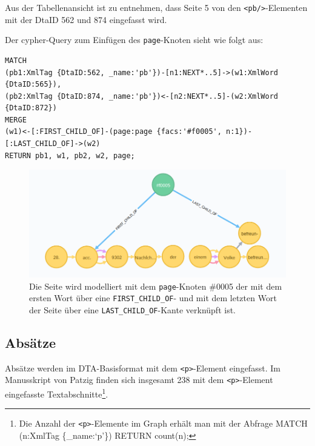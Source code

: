 \documentclass[ngerman,]{scrreprt}
\begin{document}
Aus der Tabellenansicht ist zu entnehmen, dass Seite 5 von den \texttt{\textless{}pb/\textgreater{}}-Elementen mit der DtaID 562 und 874 eingefasst wird.

Der cypher-Query zum Einfügen des \texttt{page}-Knoten sieht wie folgt aus:

\begin{verbatim}
MATCH
(pb1:XmlTag {DtaID:562, _name:'pb'})-[n1:NEXT*..5]->(w1:XmlWord {DtaID:565}),
(pb2:XmlTag {DtaID:874, _name:'pb'})<-[n2:NEXT*..5]-(w2:XmlWord {DtaID:872})
MERGE
(w1)<-[:FIRST_CHILD_OF]-(page:page {facs:'#f0005', n:1})-[:LAST_CHILD_OF]->(w2)
RETURN pb1, w1, pb2, w2, page;
\end{verbatim}

\begin{figure}
\centering
\includegraphics{Bilder/TEI2Graph/page-f0005.png}
\caption[Die Seite wird modelliert mit dem \texttt{page}-Knoten \#0005 der mit dem ersten Wort über eine \texttt{FIRST\_CHILD\_OF}- und mit dem letzten Wort der Seite über eine \texttt{LAST\_CHILD\_OF}-Kante verknüpft ist.]{Die Seite wird modelliert mit dem \texttt{page}-Knoten \#0005 der mit dem ersten Wort über eine \texttt{FIRST\_CHILD\_OF}- und mit dem letzten Wort der Seite über eine \texttt{LAST\_CHILD\_OF}-Kante verknüpft ist.\footnotemark{}}
\end{figure}

\subsection{Absätze}\label{absuxe4tze}

Absätze werden im DTA-Basisformat mit dem \texttt{\textless{}p\textgreater{}}-Element eingefasst. Im Manusskript von Patzig finden sich insgesamt 238 mit dem \texttt{\textless{}p\textgreater{}}-Element eingefasste Textabschnitte\footnote{Die Anzahl der \texttt{\textless{}p\textgreater{}}-Elemente im Graph erhält man mit der Abfrage MATCH (n:XmlTag \{\_name:`p'\}) RETURN count(n);}.
\end{document}
